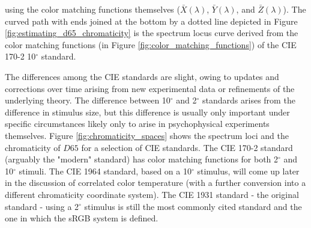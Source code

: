 \documentclass{article}
\begin{document}
\begin{multicols}{2}
using the color matching functions themselves ($\bar{X}(\lambda)$, $\bar{Y}(\lambda)$, and $\bar{Z}(\lambda)$).  The curved path with ends joined at the bottom by a dotted line depicted in Figure \ref{fig:estimating_d65_chromaticity} is the spectrum locus curve derived from the color matching functions (in Figure \ref{fig:color_matching_functions}) of the CIE 170-2 10$^\circ$ standard.

The differences among the CIE standards are slight, owing to updates and corrections over time arising from new experimental data or refinements of the underlying theory.  The difference between 10$^\circ$ and 2$^\circ$ standards arises from the difference in stimulus size, but this difference is usually only important under specific circumstances likely only to arise in psychophysical experiments themselves.  Figure \ref{fig:chromaticity_spaces} shows the spectrum loci and the chromaticity of $D65$ for a selection of CIE standards.  The CIE 170-2 standard (arguably the "modern" standard) has color matching functions for both 2$^\circ$ and 10$^\circ$ stimuli.  The CIE 1964 standard, based on a 10$^\circ$ stimulus, will come up later in the discussion of correlated color temperature (with a further conversion into a different chromaticity coordinate system).  The CIE 1931 standard - the original standard - using a 2$^\circ$ stimulus is still the most commonly cited standard and the one in which the sRGB system is defined.


\end{multicols}
\end{document}
